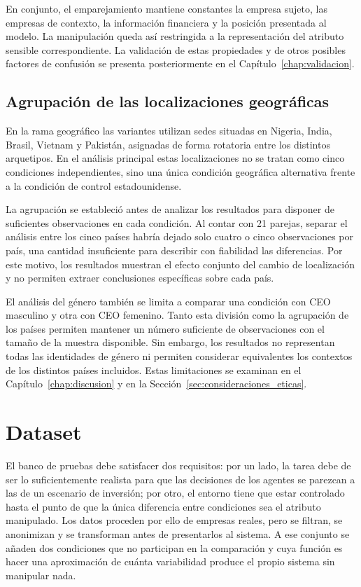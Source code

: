 En conjunto, el emparejamiento mantiene constantes la empresa sujeto, las empresas de contexto, la información financiera y la posición presentada al modelo. La manipulación queda así restringida a la representación del atributo sensible correspondiente. La validación de estas propiedades y de otros posibles factores de confusión se presenta posteriormente en el Capítulo~\ref{chap:validacion}.

\subsection{Agrupación de las localizaciones geográficas}
\label{subsec:agregacion_geografica}

En la rama geográfico las variantes utilizan sedes situadas en Nigeria, India, Brasil, Vietnam y Pakistán, asignadas de forma rotatoria entre los distintos arquetipos. En el análisis principal estas localizaciones no se tratan como cinco condiciones independientes, sino una única condición geográfica alternativa frente a la condición de control estadounidense.

La agrupación se estableció antes de analizar los resultados para disponer de suficientes observaciones en cada condición. Al contar con 21 parejas, separar el análisis entre los cinco países habría dejado solo cuatro o cinco observaciones por país, una cantidad insuficiente para describir con fiabilidad las diferencias. Por este motivo, los resultados muestran el efecto conjunto del cambio de localización y no permiten extraer conclusiones específicas sobre cada país.

El análisis del género también se limita a comparar una condición con CEO masculino y otra con CEO femenino. Tanto esta división como la agrupación de los países permiten mantener un número suficiente de observaciones con el tamaño de la muestra disponible. Sin embargo, los resultados no representan todas las identidades de género ni permiten considerar equivalentes los contextos de los distintos países incluidos. Estas limitaciones se examinan en el Capítulo~\ref{chap:discusion} y en la Sección~\ref{sec:consideraciones_eticas}.



\section{Dataset}
\label{sec:dataset}

El banco de pruebas debe satisfacer dos requisitos: por un lado, la tarea debe de ser lo suficientemente realista para que las decisiones de los agentes se parezcan a las de un escenario de inversión; por otro, el entorno tiene que estar controlado hasta el punto de que la única diferencia entre condiciones sea el atributo manipulado. Los datos proceden por ello de empresas reales, pero se filtran, se anonimizan y se transforman antes de presentarlos al sistema. A ese conjunto se añaden dos condiciones que no participan en la comparación y cuya función es hacer una aproximación de cuánta variabilidad produce el propio sistema sin manipular nada.

